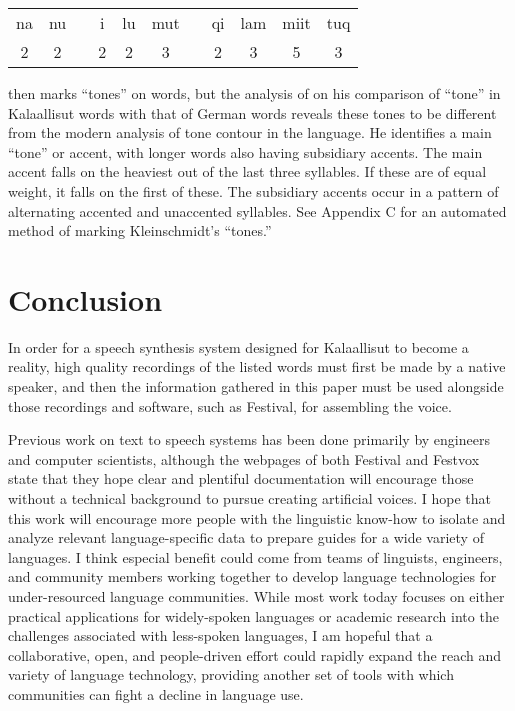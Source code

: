 \documentclass[12pt]{article}
\begin{document}
	\begin{exe}
	\item
	\begin{tabular}{ccccccccccc}
	na & nu & & i & lu & mut & & qi & lam & miit & tuq \\
	2 & 2 & & 2 & 2 & 3 & & 2 & 3 & 5 & 3 \\
	\end{tabular}
	\end{exe}

	\citet{kleinschmidt} then marks ``tones'' on words, but the analysis of \citet{rischel} on his comparison of ``tone'' in Kalaallisut words with that of German words reveals these tones to be different from the modern analysis of tone contour in the language. He identifies a main ``tone'' or accent, with longer words also having subsidiary accents. The main accent falls on the heaviest out of the last three syllables. If these are of equal weight, it falls on the first of these. The subsidiary accents occur in a pattern of alternating accented and unaccented syllables. See Appendix C for an automated method of marking Kleinschmidt's ``tones.'' \par

\section{Conclusion}

In order for a speech synthesis system designed for Kalaallisut to become a reality, high quality recordings of the listed words must first be made by a native speaker, and then the information gathered in this paper must be used alongside those recordings and software, such as Festival, for assembling the voice. \par

Previous work on text to speech systems has been done primarily by engineers and computer scientists, although the webpages of both Festival and Festvox state that they hope clear and plentiful documentation will encourage those without a technical background to pursue creating artificial voices. I hope that this work will encourage more people with the linguistic know-how to isolate and analyze relevant language-specific data to prepare guides for a wide variety of languages. I think especial benefit could come from teams of linguists, engineers, and community members working together to develop language technologies for under-resourced language communities. While most work today focuses on either practical applications for widely-spoken languages or academic research into the challenges associated with less-spoken languages, I am hopeful that a collaborative, open, and people-driven effort could rapidly expand the reach and variety of language technology, providing another set of tools with which communities can fight a decline in language use. \par
\end{document}
